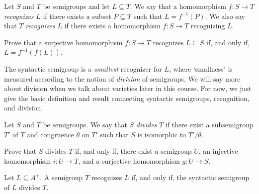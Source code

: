 \begin{definition}
Let $S$ and $T$ be semigroups and let $L \subseteq T$. We say that a homomorphism $f \colon S \to T$ \emph{recognizes} $L$ if there exists a subset $P \subseteq T$ such that $L = f^{-1}(P)$. We also say that $T$ \emph{recognizes} $L$ if there exists a homomorphism $f \colon S \to T$ recognizing $L$.
\end{definition}
\begin{exercise}\easy
  Prove that a surjective homomorphism $f \colon S \to T$ recognizes $L \subseteq S$ if, and only if, $L = f^{-1}(f(L))$.
\end{exercise}

The syntactic semigroup is a \emph{smallest} recognizer for $L$, where `smallness' is measured according to the notion of \emph{division} of semigroups. We will say more about division when we talk about varieties later in this course. For now, we just give the basic definition and result connecting syntactic semigroups, recognition, and division.
\begin{definition}
  Let $S$ and $T$ be semigroups. We say that $S$ \emph{divides} $T$ if there exist a subsemigroup $T'$ of $T$ and congruence $\theta$ on $T'$ such that $S$ is isomorphic to $T'/{\theta}$.
\end{definition}
\begin{exercise}\easy\label{exe:division}
Prove that $S$ divides $T$ if, and only if, there exist a semigroup $U$, an injective homomorphism $i \colon U \to T$, and a surjective homomorphism $g \colon U \to S$. %
\end{exercise}
\begin{proposition}
  Let $L \subseteq A^+$. A semigroup $T$ recognizes $L$ if, and only if, the syntactic semigroup of $L$ divides $T$.
\end{proposition}
